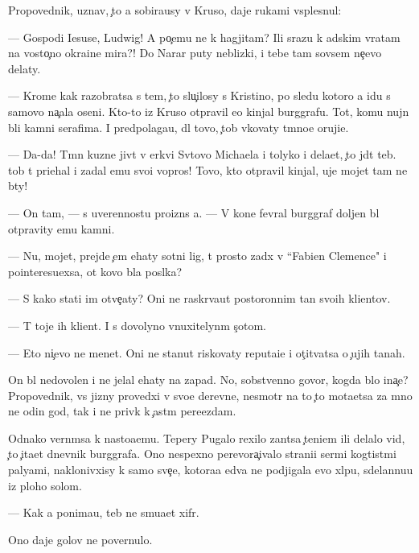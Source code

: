 \documentclass[10pt]{book}
\begin{document}
Propovednik, uznav, {\c}to {\y}a sobira{\y}usy v Kruso, daje rukami vsplesnul:

— Gospodi Iesuse, Ludwig! A po{\c}emu ne k hagjitam? Ili srazu k adskim vratam na vosto{\c}no{\y} okra{\y}ine mira?! Do Narar{\yi} puty neblizki{\y}, i tebe tam sovsem ne{\c}evo delaty.

— Krome kak razobratsa s tem, {\c}to slu{\c}ilosy s Kristino{\y}, po sledu kotoro{\y} {\y}a idu s samovo na{\c}ala oseni. Kto-to iz Kruso otpravil {\y}e{\y}o kinjal burggrafu. Tot, komu nujn{\yi} b{\yi}li kamni serafima. I predpolaga{\y}u, dl{\ia} tovo, {\c}tob{\yi} v{\yi}kovaty t{\e}mno{\y}e oruji{\y}e.

— Da-da! T{\e}mn{\yi}{\y} kuzne{\q} jiv{\e}t v {\q}erkvi Sv{\ia}tovo Michaela i tolyko i dela{\y}et, {\c}to jd{\e}t teb{\ia}. {\C}tob{\yi} t{\yi} pri{\y}ehal i zadal {\y}emu svo{\y}i vopros{\yi}! Tovo, kto otpravil kinjal, uje mojet tam ne b{\yi}ty!

— On tam, — s uverennost{\y}u proizn{\e}s {\y}a. — V kon{\q}e fevral{\ia} burggraf doljen b{\yi}l otpravity {\y}emu kamni.

— Nu, mojet, prejde {\c}em {\y}ehaty sotni lig, t{\yi} prosto za{\y}d{\e}x v ``Fabien Clemence" i po{\y}interesu{\y}exsa, ot kovo b{\yi}la pos{\yi}lka?

— S kako{\y} stati im otve{\c}aty? Oni ne raskr{\yi}va{\y}ut postoronnim ta{\y}n{\yi} svo{\y}ih kli{\y}entov.

— T{\yi} toje ih kli{\y}ent. I s dovolyno vnuxitelyn{\yi}m s{\c}otom.

— Eto ni{\c}evo ne men{\ia}{\y}et. Oni ne stanut riskovaty reputa{\q}i{\y}e{\y} i ot{\c}it{\yi}vatsa o {\c}ujih ta{\y}nah.

On b{\yi}l nedovolen i ne jelal {\y}ehaty na zapad. No, sobstvenno govor{\ia}, kogda b{\yi}lo ina{\c}e? Propovednik, vs{\iu} jizny provedxi{\y} v svo{\y}e{\y} derevne, nesmotr{\ia} na to {\c}to mota{\y}etsa za mno{\y} ne odin god, tak i ne priv{\yi}k k {\c}ast{\yi}m pere{\y}ezdam.

Odnako vern{\e}msa k nasto{\y}a{\x}emu. Tepery Pugalo rexilo zan{\ia}tsa {\c}teni{\y}em ili delalo vid, {\c}to {\c}ita{\y}et dnevnik burggrafa. Ono nespexno perevora{\c}ivalo strani{\q}i ser{\yi}mi kogtist{\yi}mi paly{\q}ami, naklonivxisy k samo{\y} sve{\c}e, kotora{\y}a {\y}edva ne podjigala {\y}evo xl{\ia}pu, sdelannu{\y}u iz ploho{\y} solom{\yi}.

— Kak {\y}a ponima{\y}u, teb{\ia} ne smu{\x}a{\y}et xifr.

Ono daje golov{\yi} ne povernulo.
\end{document}
